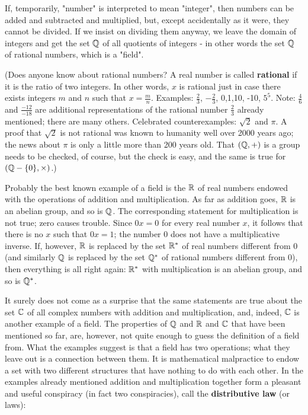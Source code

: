 If, temporarily, "number" is interpreted to mean "integer", then numbers can be added and subtracted and multiplied, but, except accidentally as it were, they cannot be divided. If we insist on dividing them anyway, we leave the domain of integers and get the set $\mathbb{Q}$ of all quotients of integers - in other words the set $\mathbb{Q}$ of rational numbers, which is a "field".

(Does anyone know about rational numbers? A real number is called \textbf{rational} if it is the ratio of two integers. In other words, $x$ is rational just in case there exists integers $m$ and $n$ such that $x = \frac{m}{n}$. Examples: $\frac{2}{3}$, $-\frac{2}{3}$, 0,1,10, -10, $5^5$. Note: $\frac{4}{6}$ and $\frac{-12}{-18}$ are additional representations of the rational number $\frac{2}{3}$ already mentioned; there are many others. Celebrated counterexamples: $\sqrt{2}$ and $\pi$. A proof that $\sqrt{2}$ is not rational was known to humanity well over 2000 years ago; the news about $\pi$ is only a little more than 200 years old. That $(\mathbb{Q}, +)$ is a group needs to be checked, of course, but the check is easy, and the same is true for $(\mathbb{Q} - \{0\}, \times)$.)

Probably the best known example of a field is the $\mathbb{R}$ of real numbers endowed with the operations of addition and multiplication. As far as addition goes, $\mathbb{R}$ is an abelian group, and so is $\mathbb{Q}$. The corresponding statement for multiplication is not true; zero causes trouble. Since $0x = 0$ for every real number $x$, it follows that there is no $x$ such that $0x = 1$; the number 0 does not have a multiplicative inverse. If, however, $\mathbb{R}$ is replaced by the set $\mathbb{R}^\ast$ of real numbers different from 0 (and similarly $\mathbb{Q}$ is replaced by the set $\mathbb{Q}^\ast$ of rational numbers different from 0), then everything is all right again: $\mathbb{R}^\ast$ with multiplication is an abelian group, and so is $\mathbb{Q}^\ast$.

It surely does not come as a surprise that the same statements are true about the set $\mathbb{C}$ of all complex numbers with addition and multiplication, and, indeed, $\mathbb{C}$ is another example of a field. The properties of $\mathbb{Q}$ and $\mathbb{R}$ and $\mathbb{C}$ that have been mentioned so far, are, however, not quite enough to guess the definition of a field from. What the examples suggest is that a field has two operations; what they leave out is a connection between them. It is mathematical malpractice to endow a set with two different structures that have nothing to do with each other. In the examples already mentioned addition and multiplication together form a pleasant and useful conspiracy (in fact two conspiracies), call the \textbf{distributive law} (or laws):

